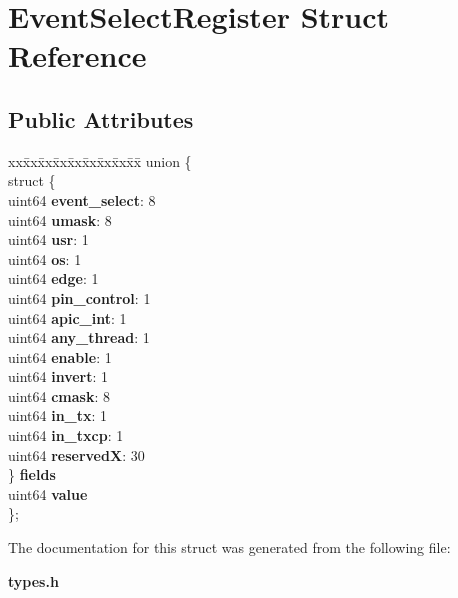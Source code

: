 \section{Event\+Select\+Register Struct Reference}
\label{structEventSelectRegister}
\subsection*{Public Attributes}
\begin{DoxyCompactItemize}
\item 
\mbox{\label{structEventSelectRegister_a1afba2fa0ccd543fa5a3ec7736d63e7d}} 
\begin{tabbing}
xx\=xx\=xx\=xx\=xx\=xx\=xx\=xx\=xx\=\kill
union \{\\
\>struct \{\\
\>\>uint64 {\bfseries event\_select}: 8\\
\>\>uint64 {\bfseries umask}: 8\\
\>\>uint64 {\bfseries usr}: 1\\
\>\>uint64 {\bfseries os}: 1\\
\>\>uint64 {\bfseries edge}: 1\\
\>\>uint64 {\bfseries pin\_control}: 1\\
\>\>uint64 {\bfseries apic\_int}: 1\\
\>\>uint64 {\bfseries any\_thread}: 1\\
\>\>uint64 {\bfseries enable}: 1\\
\>\>uint64 {\bfseries invert}: 1\\
\>\>uint64 {\bfseries cmask}: 8\\
\>\>uint64 {\bfseries in\_tx}: 1\\
\>\>uint64 {\bfseries in\_txcp}: 1\\
\>\>uint64 {\bfseries reservedX}: 30\\
\>\} {\bfseries fields}\\
\>uint64 {\bfseries value}\\
\}; \\

\end{tabbing}\end{DoxyCompactItemize}


The documentation for this struct was generated from the following file\+:\begin{DoxyCompactItemize}
\item 
\textbf{ types.\+h}\end{DoxyCompactItemize}
